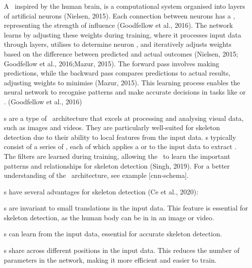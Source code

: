 

A \NN\, inspired by the human brain, is a computational system organised into layers of artificial neurons (\scc Nielsen, 2015). Each connection between neurons has a , representing the strength of influence (\scc Goodfellow et al., 2016). The network learns by adjusting these weights during training, where it processes input data through layers, utilises  to determine neuron , and iteratively adjusts weights based on the difference between predicted and actual outcomes (\scc Nielsen, 2015; \scc Goodfellow et al., 2016;\break \scc Mazur, 2015). The forward pass involves making predictions, while the backward pass compares predictions to actual results, adjusting weights to minimise  (\scc Mazur, 2015). This learning process enables the neural network to recognise patterns and make accurate decisions in tasks like  or . (\scc Goodfellow et al., 2016)

\CNN\-s are a type of \NN\ architecture that excels at processing and analysing visual data, such as images and videos. They are particularly well-suited for skeleton detection due to their ability to  local features from the input data. \CNN\-s typically consist of a series of , each of which applies a  or  to the input data to extract . The filters are learned during training, allowing the \CNN\ to learn the important patterns and relationships for skeleton detection (\scc Singh, 2019). For a better understanding of the \CNN\ architecture, see example [cnn-schema].

\CNN\-s have several advantages for skeleton detection (\scc Ce et al., 2020):

\startitemize[1]
 \item {} \CNN\-s are invariant to small translations in the input data. This feature is essential for skeleton detection, as the human body can be in  in an image or video.
 \item {} \CNN\-s can learn  from the input data, essential for accurate skeleton detection.
 \item {} \CNN\-s share  across different positions in the input data. This reduces the number of parameters in the network, making it more efficient and easier to train.
\stopitemize

